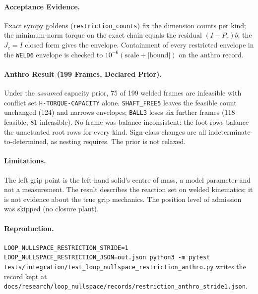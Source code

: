 \documentclass[11pt,a4paper]{article}
\begin{document}
\paragraph{Acceptance Evidence.}
Exact sympy goldens (\texttt{restriction\_counts}) fix the dimension counts per
kind; the minimum-norm torque on the exact chain equals the residual
$(I-P_r)b$; the $J_c=I$ closed form gives the envelope.  Containment of every
restricted envelope in the \texttt{WELD6} envelope is checked to
$10^{-6}(\text{scale}+|\text{bound}|)$ on the anthro record.

\paragraph{Anthro Result (199 Frames, Declared Prior).}
Under the \emph{assumed} capacity prior, 75 of 199 welded frames are
infeasible with conflict set \texttt{H-TORQUE-CAPACITY} alone.
\texttt{SHAFT\_FREE5} leaves the feasible count unchanged (124) and narrows
envelopes; \texttt{BALL3} loses six further frames (118 feasible, 81
infeasible).  No frame was balance-inconsistent: the foot rows balance the
unactuated root rows for every kind.  Sign-class changes are all
indeterminate-to-determined, as nesting requires.  The prior is not relaxed.

\paragraph{Limitations.}
The left grip point is the left-hand solid's centre of mass, a model
parameter and not a measurement.  The result describes the reaction set on
welded kinematics; it is not evidence about the true grip mechanics.  The
position level of admission was skipped (no closure plant).

\paragraph{Reproduction.}
\texttt{LOOP\_NULLSPACE\_RESTRICTION\_STRIDE=1 LOOP\_NULLSPACE\_RESTRICTION\_JSON=out.json
python3 -m pytest tests/integration/test\_loop\_nullspace\_restriction\_anthro.py}
writes the record kept at
\texttt{docs/research/loop\_nullspace/records/restriction\_anthro\_stride1.json}.
\end{document}
